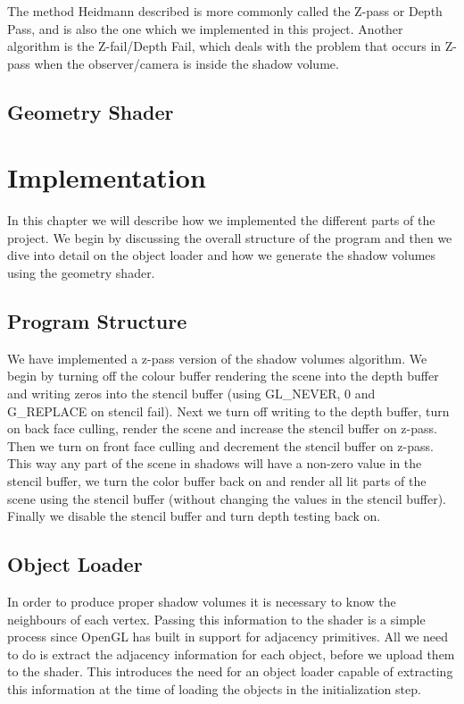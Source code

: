 \documentclass[a4paper, 12pt]{article}
\begin{document}
The method Heidmann described is more commonly called the Z-pass or Depth Pass, and is also the one which we implemented in this project. Another algorithm is the Z-fail/Depth Fail, which deals with the problem that occurs in Z-pass when the observer/camera is inside the shadow volume. 
\subsection{Geometry Shader}

\section{Implementation}
In this chapter we will describe how we implemented the different parts of the project. We begin by discussing the overall structure of the program and then we dive into detail on the object loader and how we generate the shadow volumes using the geometry shader.
\subsection{Program Structure}
We have implemented a z-pass version of the shadow volumes algorithm. We begin
by turning off the colour buffer rendering the scene into the depth buffer and
writing zeros into the stencil buffer (using GL\_NEVER, 0 and G\_REPLACE on
stencil fail). Next we turn off writing to the depth buffer, turn on back face
culling, render the scene and increase the stencil buffer on z-pass. Then we
turn on front face culling and decrement the stencil buffer on z-pass. This way
any part of the scene in shadows will have a non-zero value in the stencil
buffer, we turn the color buffer back on and render all lit parts of the scene
using the stencil buffer (without changing the values in the stencil buffer).
Finally we disable the stencil buffer and turn depth testing back on.

\subsection{Object Loader}
In order to produce proper shadow volumes it is necessary to know the neighbours
of each vertex. Passing this information to the shader is a simple process since
OpenGL has built in support for adjacency primitives. All we need to do is
extract the adjacency information for each object, before we upload them to the
shader. This introduces the need for an object loader capable of extracting this
information at the time of loading the objects in the initialization step.
\end{document}
